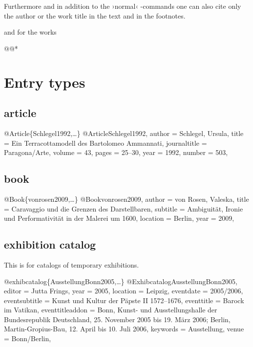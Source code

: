 \documentclass[a4paper,
10pt,
ngerman,
english
]{ltxdoc}
\begin{document}
\DescribeMacro{\citeauthor}\DescribeMacro{\citetitle}\label{citeauthor}%
Furthermore and in addition to the ›normal‹ -commands one can also cite only the author or the work title in the text and in the footnotes.
  and for the works 
\begin{code}
\citetitle*@@*
\end{code} 

\section{Entry types}
\subsection{article}
\begin{bibexample}[label=Schlegel1992]{{@}Article\{Schlegel1992,…\}}
@Article{Schlegel1992,
  author       = {Schlegel, Ursula},
  title        = {Ein Terracottamodell des Bartolomeo Ammannati},
  journaltitle = {Paragona/Arte},
  volume       = {43},
  pages        = {25--30},
  year         = {1992},
  number       = {503},
}
\end{bibexample}


\subsection{book}
\begin{bibexample}[label=vonrosen2009]{{@}Book\{vonrosen2009,…\}}
@Book{vonrosen2009,
  author   = {von Rosen, Valeska},
  title    = {Caravaggio und die Grenzen des Darstellbaren},
  subtitle = {Ambiguität, Ironie und Performativität in der Malerei um 1600},
  location = {Berlin},
  year     = {2009},
}
\end{bibexample}

\subsection{exhibition catalog}
This is for catalogs of temporary exhibitions.
\begin{bibexample}[label=AusstellungBonn2005]{{@}exhibcatalog\{AusstellungBonn2005,…\}}
@Exhibcatalog{AusstellungBonn2005,
  editor          = {Jutta Frings},
  year            = {2005},
  location        = {Leipzig},
  eventdate       = {2005/2006},
  eventsubtitle   = {Kunst und Kultur der Päpste II 1572--1676},
  eventtitle      = {Barock im Vatikan},
  eventtitleaddon = {Bonn, Kunst- und Ausstellungshalle der Bundesrepublik Deutschland, 25. November 2005 bis 19. März 2006; Berlin, Martin-Gropius-Bau, 12. April bis 10. Juli 2006},
  keywords        = {Ausstellung},
  venue           = {Bonn/Berlin},
}
\end{bibexample}
\end{document}
